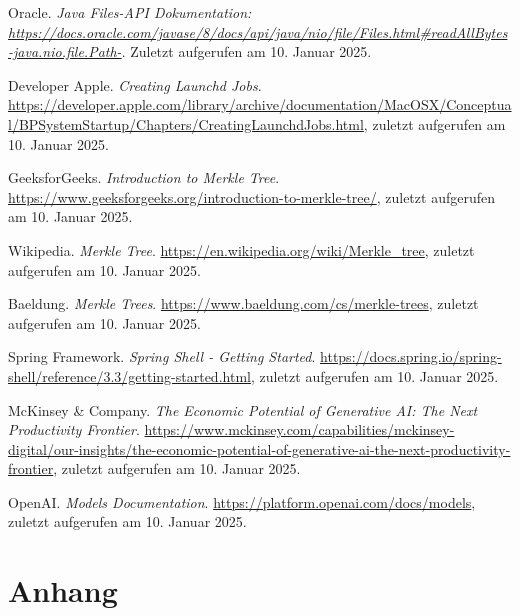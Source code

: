 \documentclass[a4paper,12pt]{report}
\begin{document}
    \clearpage
    \begin{thebibliography}{99}

        Oracle.
        \textit{Java Files-API Dokumentation: \url{https://docs.oracle.com/javase/8/docs/api/java/nio/file/Files.html\#readAllBytes-java.nio.file.Path-}}.
        Zuletzt aufgerufen am 10. Januar 2025.

        Developer Apple.
        \textit{Creating Launchd Jobs}.
        \url{https://developer.apple.com/library/archive/documentation/MacOSX/Conceptual/BPSystemStartup/Chapters/CreatingLaunchdJobs.html}, zuletzt aufgerufen am 10. Januar 2025.


        GeeksforGeeks.
        \textit{Introduction to Merkle Tree}.
        \url{https://www.geeksforgeeks.org/introduction-to-merkle-tree/}, zuletzt aufgerufen am 10. Januar 2025.

        Wikipedia.
        \textit{Merkle Tree}.
        \url{https://en.wikipedia.org/wiki/Merkle_tree}, zuletzt aufgerufen am 10. Januar 2025.

        Baeldung.
        \textit{Merkle Trees}.
        \url{https://www.baeldung.com/cs/merkle-trees}, zuletzt aufgerufen am 10. Januar 2025.

        Spring Framework.
        \textit{Spring Shell - Getting Started}.
        \url{https://docs.spring.io/spring-shell/reference/3.3/getting-started.html}, zuletzt aufgerufen am 10. Januar 2025.

        McKinsey \& Company.
        \textit{The Economic Potential of Generative AI: The Next Productivity Frontier}.
        \url{https://www.mckinsey.com/capabilities/mckinsey-digital/our-insights/the-economic-potential-of-generative-ai-the-next-productivity-frontier}, zuletzt aufgerufen am 10. Januar 2025.

        OpenAI\@.
        \textit{Models Documentation}.
        \url{https://platform.openai.com/docs/models}, zuletzt aufgerufen am 10. Januar 2025.

    \end{thebibliography}

    \appendix


    \chapter{Anhang}
    \clearpage
\end{document}
